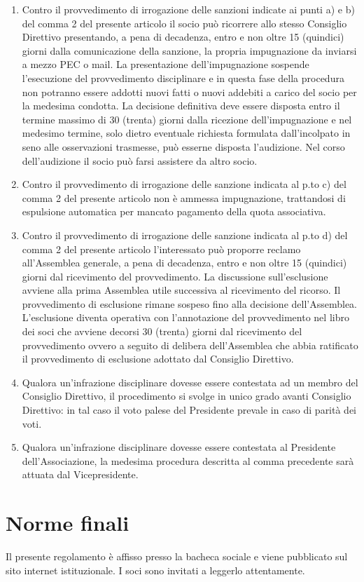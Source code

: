 \documentclass{djtsdoc}
\begin{document}
\begin{enumerate}
		\item Contro il provvedimento di irrogazione delle sanzioni indicate ai punti a) e b) del comma 2 del presente articolo il socio può ricorrere allo stesso Consiglio Direttivo presentando, a pena di decadenza, entro e non oltre 15 (quindici) giorni  dalla comunicazione della sanzione, la propria impugnazione da inviarsi a mezzo PEC o mail. La presentazione dell'impugnazione sospende l'esecuzione del provvedimento disciplinare e in questa fase della procedura non potranno essere addotti nuovi fatti o nuovi addebiti a carico del socio per la medesima condotta. La decisione definitiva deve essere disposta entro il termine massimo di 30 (trenta) giorni dalla ricezione dell'impugnazione e nel medesimo termine, solo dietro eventuale richiesta formulata dall'incolpato in seno alle osservazioni trasmesse, può esserne disposta l'audizione. Nel corso dell'audizione il socio può farsi assistere da altro socio.
		\item Contro il provvedimento di irrogazione delle sanzione indicata al p.to c) del comma 2 del presente articolo  non è ammessa impugnazione, trattandosi di espulsione automatica per mancato pagamento della quota associativa.
		\item Contro il provvedimento di irrogazione delle sanzione indicata al p.to d) del comma 2 del presente articolo l'interessato può proporre reclamo all'Assemblea generale, a pena di decadenza, entro e non oltre 15 (quindici) giorni dal ricevimento del provvedimento. La discussione sull'esclusione avviene alla prima Assemblea utile successiva al ricevimento del ricorso. Il provvedimento di esclusione rimane sospeso fino alla decisione dell'Assemblea. L'esclusione diventa operativa con l'annotazione del provvedimento nel libro dei soci che avviene decorsi  30 (trenta) giorni dal ricevimento del provvedimento ovvero a seguito di delibera dell'Assemblea che abbia ratificato il provvedimento di esclusione adottato dal Consiglio Direttivo.
		\item Qualora un'infrazione disciplinare dovesse essere contestata ad un membro del Consiglio Direttivo, il procedimento si svolge in unico grado avanti Consiglio Direttivo: in tal caso il voto palese del Presidente prevale in caso di parità dei voti.
		\item Qualora un'infrazione disciplinare dovesse essere contestata al Presidente dell'Associazione, la medesima procedura descritta al comma precedente sarà attuata dal Vicepresidente.
	\end{enumerate}
	
	\section*{Norme finali}
	Il presente regolamento è affisso presso la bacheca sociale e viene pubblicato sul sito internet istituzionale. I soci sono invitati a leggerlo attentamente.
	
\end{document}
